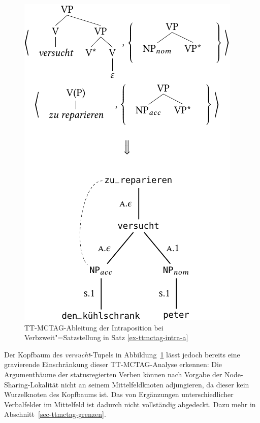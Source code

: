 \begin{figure}[t]
\centering
\includegraphics{graphics/abb714.pdf}
\caption{\label{fig-ttmctag-koh1}TT-MCTAG-Ableitung der Intraposition bei Verbzweit"=Satzstellung in Satz \ref{ex-ttmctag-intra-a}}
\end{figure}

Der Kopfbaum des {\it versucht}-Tupels in Abbildung~\ref{fig-ttmctag-koh1} lässt jedoch bereits eine gravierende Einschränkung dieser TT-MCTAG-Analyse erkennen: Die Argumentbäume der statusregierten Verben können nach Vorgabe der Node-Sharing-Lokalität nicht an seinem Mittelfeldknoten adjungieren, da dieser kein Wurzelknoten des Kopfbaums ist. Das  von Ergänzungen unterschiedlicher Verbalfelder im Mittelfeld ist dadurch nicht vollständig abgedeckt. Dazu mehr in Abschnitt~\ref{sec-ttmctag-grenzen}.

